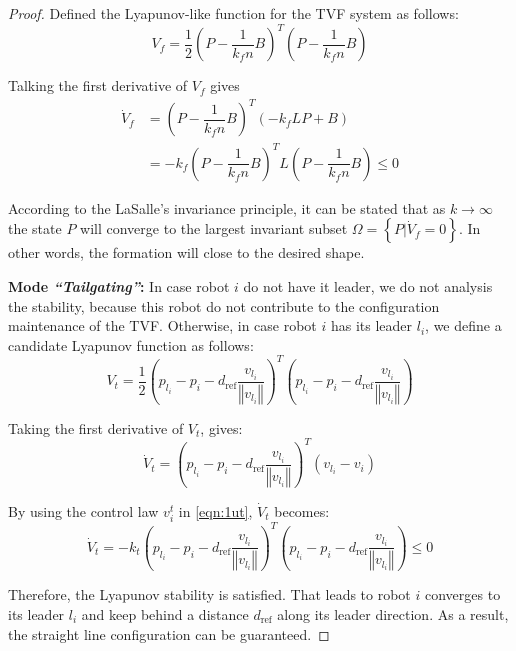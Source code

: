 \begin{proof}
Defined the Lyapunov-like function for the TVF system as follows:
\begin{equation}
    V_f=\dfrac{1}{2}\left(P-\dfrac{1}{k_fn}B\right)^T\left(P-\dfrac{1}{k_fn}B\right)
\end{equation}

Talking the first derivative of $V_f$ gives
\begin{equation}
\begin{aligned}
    \dot{V}_f&=\left(P-\dfrac{1}{k_fn}B\right)^T\left(-k_fLP+B\right)\\
    &=-k_f\left(P-\dfrac{1}{k_fn}B\right)^TL\left(P-\dfrac{1}{k_fn}B\right)\leq0
\end{aligned}
\end{equation}

According to the LaSalle’s invariance
principle, it can be stated that as $k\to\infty$ the state $P$ will converge to the largest invariant subset $\Omega=\left\{P|\dot{V}_f=0\right\}$. In other words, the formation will close to the desired shape.

\textbf{Mode \textit{``Tailgating''}:} In case robot $i$ do not have it leader, we do not analysis the stability, because this robot do not contribute to the configuration maintenance of the TVF. Otherwise, in case robot $i$ has its leader $l_i$, we define a candidate Lyapunov function as follows:
\begin{equation}
    V_{t}=\dfrac{1}{2}\left(p_{l_i}-p_{i}-d_\text{ref}\dfrac{v_{l_i}}{\left\Vert v_{l_i}\right\Vert}\right)^{T}\left(p_{l_i}-p_{i}-d_\text{ref}\dfrac{v_{l_i}}{\left\Vert v_{l_i}\right\Vert}\right)
\end{equation}

Taking the first derivative of $V_t$, gives:
\begin{equation}
    \dot{V}_{t}=\left(p_{l_i}-p_{i}-d_\text{ref}\dfrac{v_{l_i}}{\left\Vert v_{l_i}\right\Vert}\right)^{T}\left(v_{l_i}-v_{i}\right)
\end{equation}

By using the control law $v^t_i$ in \eqref{eqn:1ut}, $\dot{V}_t$ becomes:
\begin{equation}
    \dot{V}_{t}=-k_{t}\left(p_{l_i}-p_{i}-d_\text{ref}\dfrac{v_{l_i}}{\left\Vert v_{l_i}\right\Vert}\right)^{T}\left(p_{l_i}-p_{i}-d_\text{ref}\dfrac{v_{l_i}}{\left\Vert v_{l_i}\right\Vert}\right)\leq0
\end{equation}

Therefore, the Lyapunov stability is satisfied. That leads to robot $i$ converges to its leader $l_i$ and keep behind a distance $d_\text{ref}$ along its leader direction. As a result, the straight line configuration can be guaranteed.
\end{proof}

